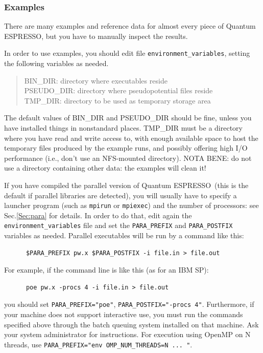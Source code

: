 \documentclass[12pt,a4paper]{article}
\def\qe{{\sc Quantum ESPRESSO}}
\begin{document}
\subsubsection{Examples}
There are many examples and reference data for almost every piece of \qe,
but you have to manually inspect the results.

In order to use examples, you should edit file \texttt{environment\_variables},
setting the following variables as needed.
\begin{quote}
   BIN\_DIR: directory where executables reside\\
   PSEUDO\_DIR: directory where pseudopotential files reside\\
   TMP\_DIR: directory to be used as temporary storage area
\end{quote}
The default values of BIN\_DIR and PSEUDO\_DIR should be fine,
unless you have installed things in nonstandard places. TMP\_DIR
must be a directory where you have read and write access to, with
enough available space to host the temporary files produced by the
example runs, and possibly offering high I/O performance (i.e., don't
use an NFS-mounted directory). NOTA BENE: do not use a
directory containing other data: the examples will clean it!

If you have compiled the parallel version of \qe\ (this
is the default if parallel libraries are detected), you will usually
have to specify a launcher program (such as \texttt{mpirun} or
\texttt{mpiexec}) and the number of processors: see Sec.\ref{Sec:para} for
details. In order to do that, edit again the \texttt{environment\_variables}
file and set the \texttt{PARA\_PREFIX} and \texttt{PARA\_POSTFIX} variables
as needed. Parallel executables will be run by a command like this:
\begin{verbatim}
      $PARA_PREFIX pw.x $PARA_POSTFIX -i file.in > file.out
\end{verbatim}
For example, if the command line is like this (as for an IBM SP):
\begin{verbatim}
      poe pw.x -procs 4 -i file.in > file.out
\end{verbatim}
you should set \texttt{PARA\_PREFIX="poe"}, \texttt{PARA\_POSTFIX="-procs 4"}.
Furthermore, if your machine does not support interactive use, you
must run the commands specified above through the batch queuing
system installed on that machine. Ask your system administrator for
instructions. For execution using OpenMP on N threads,
use \texttt{PARA\_PREFIX="env OMP\_NUM\_THREADS=N ... "}.
\end{document}
